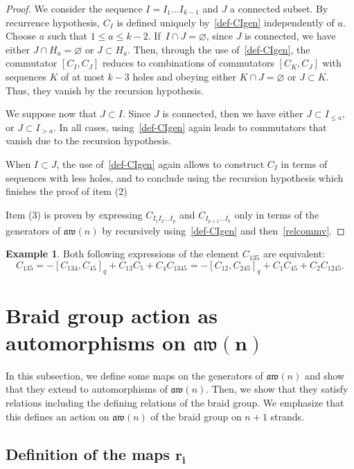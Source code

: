 \documentclass[pdftex]{sigma}
\numberwithin{equation}{section}
\theoremstyle{definition}
\newtheorem{exam}[theo]{Example}
\newcommand{\aw}{\mathfrak{aw}(n)}
\begin{document}
\begin{proof}
We consider the
sequence $I=I_1\dots I_{k-1}$ and $J$ a connected subset. By recurrence hypothesis, $C_I$ is defined uniquely by~\eqref{def-CIgen} independently of $a$.
Choose $a$ such that $1\leq a \leq k-2$.
If~$I\cap J=\varnothing$, since $J$ is connected, we have either $J\cap H_a=\varnothing$ or $J\subset H_a$.
Then, through the use of~\eqref{def-CIgen}, the commutator $[C_I,C_J]$ reduces to combinations of commutators $[C_K,C_J]$ with
sequences $K$ of at most $k-3$ holes and obeying either $K\cap J=\varnothing$ or $J\subset K$. Thus, they vanish by the recursion hypothesis.

We suppose now that $J\subset I$. Since $J$ is connected, then we have either $J\subset I_{\leq a}$, or $J\subset I_{>a}$.
In all cases, using~\eqref{def-CIgen} again leads to commutators that vanish due to the recursion hypothesis.

When $I\subset J$, the use of~\eqref{def-CIgen} again allows to construct $C_I$ in terms of sequences with less holes, and to conclude using the recursion hypothesis which finishes the proof of item (2)

Item (3) is proven by expressing $C_{I_1I_2\dots I_p}$ and $C_{I_{p+1}\dots I_k}$ only in terms of the generators of $\aw$ by recursively using~\eqref{def-CIgen} and then~\eqref{relcommv}.
\end{proof}

\begin{exam}
Both following expressions of the element $C_{135}$ are equivalent:
\begin{equation*}
 C_{135} =-[C_{134},C_{45}]_q+C_{13}C_{5}+C_{4}C_{1345}=-[C_{12},C_{245}]_q+C_1C_{45}+C_2C_{1245} .
\end{equation*}
\end{exam}

\section[Braid group action as automorphisms on aw(n)]{Braid group action as automorphisms on $\boldsymbol{\aw}$}\label{sec-auto}

In this subsection, we define some maps on the generators of $\aw$ and show that they extend to automorphisms of $\aw$.
Then, we show that they satisfy relations including the defining relations of the braid group. We emphasize that this defines an action on $\aw$ of the braid group on $n+1$ strands.

\subsection[Definition of the maps r\_i]{Definition of the maps $\boldsymbol{r_i}$}
\end{document}
